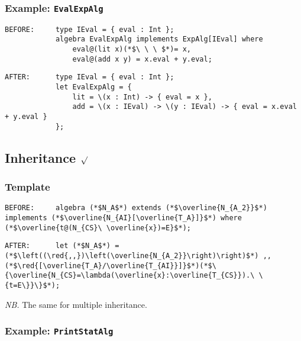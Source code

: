 \documentclass{article}
\newcommand{\red}[1]{\textcolor{red}{#1}}
\newcommand{\nb}{\textit{NB. }}
\begin{document}
\begin{spacing}{1.1}
\subsubsection{Example: \lstinline{EvalExpAlg}}

\begin{lstlisting}[numbers=none]
BEFORE:     type IEval = { eval : Int };
            algebra EvalExpAlg implements ExpAlg[IEval] where
                eval@(lit x)(*$\ \ \ $*)= x,
                eval@(add x y) = x.eval + y.eval;
\end{lstlisting}
\begin{lstlisting}[numbers=none]
AFTER:      type IEval = { eval : Int };
            let EvalExpAlg = {
                lit = \(x : Int) -> { eval = x },
                add = \(x : IEval) -> \(y : IEval) -> { eval = x.eval + y.eval }
            };
\end{lstlisting}

\subsection{Inheritance $\surd$}

\subsubsection{Template}

\begin{lstlisting}[numbers=none]
BEFORE:     algebra (*$N_A$*) extends (*$\overline{N_{A_2}}$*) implements (*$\overline{N_{AI}[\overline{T_A}]}$*) where (*$\overline{t@(N_{CS}\ \overline{x})=E}$*);
\end{lstlisting}
\begin{lstlisting}[numbers=none]
AFTER:      let (*$N_A$*) =  (*$\left((\red{,,})\left(\overline{N_{A_2}}\right)\right)$*) ,, (*$\red{[\overline{T_A}/\overline{T_{AI}}]}$*)(*$\{\overline{N_{CS}=\lambda(\overline{x}:\overline{T_{CS}}).\ \{t=E\}}\}$*);
\end{lstlisting}

\nb The same for multiple inheritance.

\subsubsection{Example: \lstinline{PrintStatAlg}}


\end{spacing}
\end{document}
